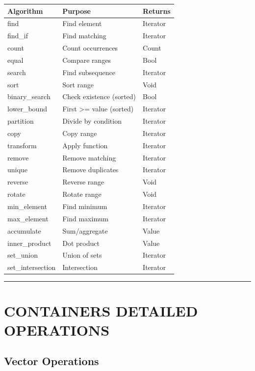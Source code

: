 \begin{longtable}[]{@{}lll@{}}
\toprule
Algorithm & Purpose & Returns \\
\midrule
\endhead
find & Find element & Iterator \\
find\_if & Find matching & Iterator \\
count & Count occurrences & Count \\
equal & Compare ranges & Bool \\
search & Find subsequence & Iterator \\
sort & Sort range & Void \\
binary\_search & Check existence (sorted) & Bool \\
lower\_bound & First \textgreater= value (sorted) & Iterator \\
partition & Divide by condition & Iterator \\
copy & Copy range & Iterator \\
transform & Apply function & Iterator \\
remove & Remove matching & Iterator \\
unique & Remove duplicates & Iterator \\
reverse & Reverse range & Void \\
rotate & Rotate range & Void \\
min\_element & Find minimum & Iterator \\
max\_element & Find maximum & Iterator \\
accumulate & Sum/aggregate & Value \\
inner\_product & Dot product & Value \\
set\_union & Union of sets & Iterator \\
set\_intersection & Intersection & Iterator \\
\bottomrule
\end{longtable}

\begin{center}\rule{0.5\linewidth}{0.5pt}\end{center}

\hypertarget{containers-detailed-operations}{%
\section{CONTAINERS DETAILED
OPERATIONS}\label{containers-detailed-operations}}

\hypertarget{vector-operations}{%
\subsection{Vector Operations}\label{vector-operations}}


